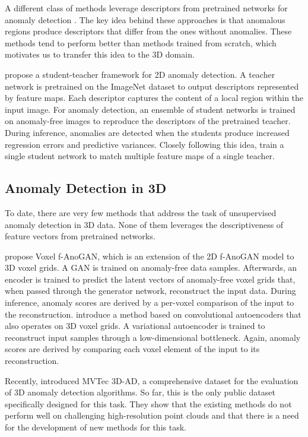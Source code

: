 \documentclass[twoside,11pt]{article}
\begin{document}
A different class of methods leverage descriptors from pretrained networks for anomaly detection \citep{bergmann2020uninformed,cohen_2020_spade,Defard_2021_PaDiM,Gudovskiy_2022_CFLOW,Mishra_2020_piade,Reiss_2021_PANDA,Rippel_2021_Gaussian}. The key idea behind these approaches is that anomalous regions produce descriptors that differ from the ones without anomalies. These methods tend to perform better than methods trained from scratch, which motivates us to transfer this idea to the 3D domain. 

\citet{bergmann2020uninformed} propose a student-teacher framework for 2D anomaly detection. A teacher network is pretrained on the ImageNet dataset to output descriptors represented by feature maps. Each descriptor captures the content of a local region within the input image. For anomaly detection, an ensemble of student networks is trained on anomaly-free images to reproduce the descriptors of the pretrained teacher. During inference, anomalies are detected when the students produce increased regression errors and predictive variances. Closely following this idea, \citet{Salehi_2021_CVPR} train a single student network to match multiple feature maps of a single teacher.

\subsection{Anomaly Detection in 3D}

To date, there are very few methods that address the task of unsupervised anomaly detection in 3D data. None of them leverages the descriptiveness of feature vectors from pretrained networks.

\citet{Simarro_Viana_2021} propose Voxel f-AnoGAN, which is an extension of the 2D f-AnoGAN model \citep{Schlegl_2019_fAnoGan} to 3D voxel grids. A GAN is trained on anomaly-free data samples. Afterwards, an encoder is trained to predict the latent vectors of anomaly-free voxel grids that, when passed through the generator network, reconstruct the input data. During inference, anomaly scores are derived by a per-voxel comparison of the input to the reconstruction. \citet{Bengs_2021_AE_on_MRI} introduce a method based on convolutional autoencoders that also operates on 3D voxel grids. A variational autoencoder is trained to reconstruct input samples through a low-dimensional bottleneck. Again, anomaly scores are derived by comparing each voxel element of the input to its reconstruction.

Recently, \citet{Bergmann_2022_mvtec_3dad} introduced MVTec 3D-AD, a comprehensive dataset for the evaluation of 3D anomaly detection algorithms. 
So far, this is the only public dataset specifically designed for this task. They show that the existing methods do not perform well on challenging high-resolution point clouds and that there is a need for the development of new methods for this task.
\end{document}
